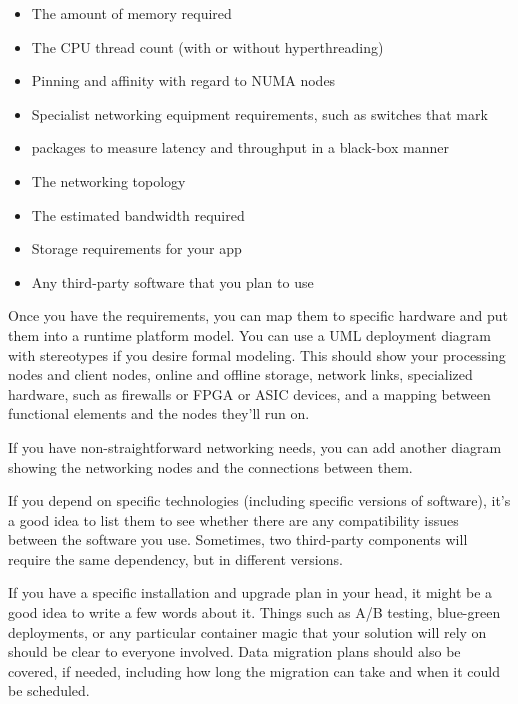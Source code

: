 \begin{itemize}
\item
The amount of memory required

\item 
The CPU thread count (with or without hyperthreading)

\item 
Pinning and affinity with regard to NUMA nodes

\item 
Specialist networking equipment requirements, such as switches that mark

\item 
packages to measure latency and throughput in a black-box manner

\item 
The networking topology

\item 
The estimated bandwidth required

\item 
Storage requirements for your app

\item 
Any third-party software that you plan to use
\end{itemize}

Once you have the requirements, you can map them to specific hardware and put them into a runtime platform model. You can use a UML deployment diagram with stereotypes if you desire formal modeling. This should show your processing nodes and client nodes, online and offline storage, network links, specialized hardware, such as firewalls or FPGA or ASIC devices, and a mapping between functional elements and the nodes they'll run on.

If you have non-straightforward networking needs, you can add another diagram showing the networking nodes and the connections between them. 

If you depend on specific technologies (including specific versions of software), it's a good idea to list them to see whether there are any compatibility issues between the software you use. Sometimes, two third-party components will require the same dependency, but in different versions.

If you have a specific installation and upgrade plan in your head, it might be a good idea to write a few words about it. Things such as A/B testing, blue-green deployments, or any particular container magic that your solution will rely on should be clear to everyone involved. Data migration plans should also be covered, if needed, including how long the migration can take and when it could be scheduled.

